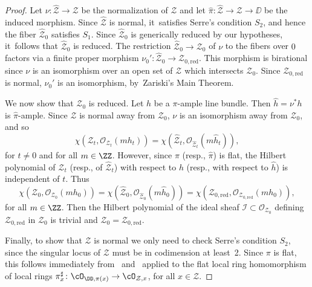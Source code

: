 \begin{proof}
Let $\nu\colon\widehat{\mathcal{Z}}\to\mathcal{Z}$ be the normalization of $\mathcal{Z}$ and let $\widehat{\pi}\colon \widehat{\mathcal{Z}} \to \mathcal{Z} \to \DD$ be the induced morphism.
Since $\widehat{\mathcal{Z}}$ is normal, it~satisfies Serre's condition $S_2$, and hence the fiber $\widehat{\mathcal{Z}}_0$ satisfies $S_1$.
Since $\widehat{\mathcal{Z}}_0$ is generically reduced by our hypotheses, it~follows that $\widehat{\mathcal{Z}}_0$ is reduced.
The restriction $\widehat{\mathcal{Z}}_0 \to \mathcal{Z}_0$ of $\nu$ to the fibers over $0$ factors via a finite proper morphism $\nu_0': \widehat{\mathcal{Z}}_0 \to \mathcal{Z}_{0,\mathrm{red}}$.
This morphism is birational since $\nu$ is an isomorphism over an open set of $\mathcal{Z}$ which intersects $\mathcal{Z}_0$.
Since $\mathcal{Z}_{0,\mathrm{red}}$ is normal, $\nu_0'$ is an isomorphism, by~Zariski's Main Theorem.

We now show that $\mathcal{Z}_0$ is reduced.
Let $h$ be a $\pi$-ample line bundle.
Then $\widehat{h}=\nu^* h$ is $\widehat{\pi}$-ample.
Since $\mathcal{Z}$ is normal away from $\mathcal{Z}_0$, $\nu$ is an isomorphism away from $\mathcal{Z}_0$, and so
\[
\chi(\mathcal{Z}_t,\mathcal{O}_{\mathcal{Z}_t}(mh_t))=\chi(\widehat{\mathcal{Z}}_t,\mathcal{O}_{\widehat{\mathcal{Z}}_t} (m\widehat{h}_t)),
\]
for $t \neq 0$ and for all $m\in\ZZ$.
However, since $\pi$ (resp., $\widehat{\pi}$) is flat, the Hilbert polynomial of $\mathcal{Z}_t$ (resp., of $\widehat{\mathcal{Z}}_t$) with respect to $h$ (resp., with respect to $\widehat{h}$) is independent of $t$.
Thus
\[
\chi(\mathcal{Z}_0,\mathcal{O}_{\mathcal{Z}_0}(mh_0))=\chi(\widehat{\mathcal{Z}}_0,\mathcal{O}_{\widehat{\mathcal{Z}}_0} (m\widehat{h}_0))=\chi(\mathcal{Z}_{0,\mathrm{red}},\mathcal{O}_{\mathcal{Z}_{0,\mathrm{red}}}(mh_0)),
\]
for all $m\in\ZZ$.
Then the Hilbert polynomial of the ideal sheaf $\mathcal{I} \subset \mathcal{O}_{\mathcal{Z}_0}$ defining $\mathcal{Z}_{0,\mathrm{red}}$ in $\mathcal{Z}_0$ is trivial and $\mathcal{Z}_0=\mathcal{Z}_{0,\mathrm{red}}$.

Finally, to show that $\mathcal{Z}$ is normal we only need to check Serre's condition $S_2$, since the singular locus of $\mathcal{Z}$ must be in codimension at least~2.
Since $\pi$ is flat, this follows immediately from~ and~ applied to the flat local ring homomorphism of local rings $\pi_x^{\sharp}\colon\cO_{\DD,\pi(x)}\to \cO_{\mathcal{Z},x}$, for all $x\in \mathcal{Z}$.
\end{proof}

